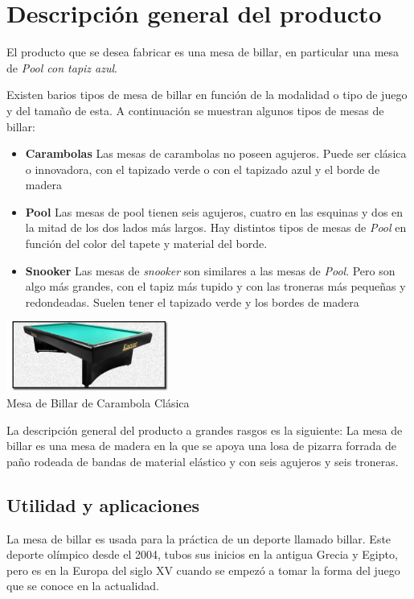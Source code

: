 \section {Descripción general del producto}
	El producto que se desea fabricar es una mesa de billar, en particular una mesa de \emph{Pool con tapiz azul}.

Existen barios tipos de mesa de billar en función de la modalidad o tipo de juego y del tamaño de esta. A continuación se muestran algunos tipos de mesas de billar:

\begin{itemize}
\item {\bf Carambolas}
 Las mesas de carambolas no poseen agujeros. Puede ser clásica o innovadora, con el tapizado verde o  con el tapizado azul y el borde de madera
\item {\bf Pool} 
Las mesas de pool tienen seis agujeros, cuatro en las esquinas y dos en la mitad de los dos lados más largos. Hay distintos tipos de mesas de \emph{Pool} en función del color del tapete y material del borde.
\item {\bf Snooker}
Las mesas de \emph{snooker} son similares a las mesas de \emph{Pool}. Pero son algo más grandes, con el tapiz más tupido y con las troneras más pequeñas y redondeadas. Suelen tener el tapizado verde y los bordes de madera
\end{itemize}

	  \begin{center}
    			\includegraphics[width=0.4\textwidth]{PiramidCaram.jpg} \\
 \small { Mesa de Billar de Carambola  Clásica}
		\end{center}

La descripción general del producto a grandes rasgos es la siguiente: La mesa de billar es una mesa de madera en la que se apoya una losa de pizarra forrada de paño rodeada de bandas de material elástico y con seis agujeros y seis troneras. 
	
	\subsection {Utilidad y aplicaciones}
	La mesa de billar es usada para la práctica de un deporte llamado billar. Este deporte olímpico desde el 2004, tubos sus inicios en la 
 antigua  Grecia y Egipto, pero es en la Europa del siglo XV cuando se empezó a tomar la forma del juego que se conoce en la actualidad. 

